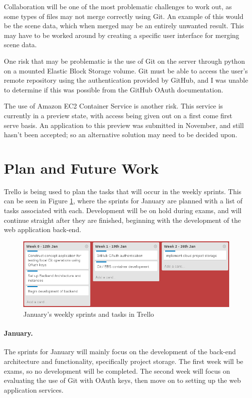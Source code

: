 \documentclass[a4paper, 12pt]{article}
\begin{document}
Collaboration will be one of the most problematic challenges to work out, as some types of files may not merge correctly using Git. An example of this would be the scene data, which when merged may be an entirely unwanted result. This may have to be worked around by creating a specific user interface for merging scene data.

One risk that may be problematic is the use of Git on the server through python on a mounted Elastic Block Storage volume. Git must be able to access the user's remote repository using the authentication provided by GitHub, and I was unable to determine if this was possible from the GitHub OAuth documentation.

The use of Amazon EC2 Container Service is another risk. This service is currently in a preview state, with access being given out on a first come first serve basis. An application to this preview was submitted in November, and still hasn't been accepted; so an alternative solution may need to be decided upon.

\section{Plan and Future Work}
Trello is being used to plan the tasks that will occur in the weekly sprints. This can be seen in Figure \ref{fig:trello1}, where the sprints for January are planned with a list of tasks associated with each. Development will be on hold during exams, and will continue straight after they are finished, beginning with the development of the web application back-end.

\begin{figure}[h]
	\centering
	\includegraphics[scale=0.5]{trello1}
	\caption{January's weekly sprints and tasks in Trello}
	\label{fig:trello1}
\end{figure}

\paragraph{January.}
The sprints for January will mainly focus on the development of the back-end architecture and functionality, specifically project storage. The first week will be exams, so no development will be completed. The second week will focus on evaluating the use of Git with OAuth keys, then move on to setting up the web application services.
\end{document}
